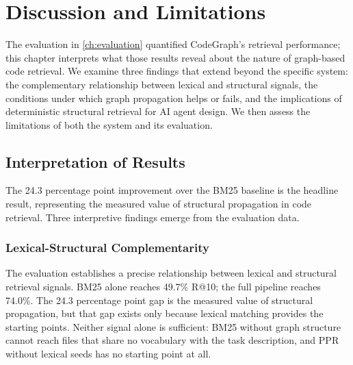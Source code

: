 
\chapter{Discussion and Limitations}
\label{ch:discussion}

The evaluation in \cref{ch:evaluation} quantified CodeGraph's retrieval performance; this chapter interprets what those results reveal about the nature of graph-based code retrieval. We examine three findings that extend beyond the specific system: the complementary relationship between lexical and structural signals, the conditions under which graph propagation helps or fails, and the implications of deterministic structural retrieval for AI agent design. We then assess the limitations of both the system and its evaluation.


\section{Interpretation of Results}
\label{sec:interpretation}

The 24.3 percentage point improvement over the BM25 baseline is the headline result, representing the measured value of structural propagation in code retrieval. Three interpretive findings emerge from the evaluation data.

\subsection{Lexical-Structural Complementarity}
\label{sec:complementarity}

The evaluation establishes a precise relationship between lexical and structural retrieval signals. BM25 alone reaches 49.7\% R@10; the full pipeline reaches 74.0\%. The 24.3 percentage point gap is the measured value of structural propagation, but that gap exists only because lexical matching provides the starting points. Neither signal alone is sufficient: BM25 without graph structure cannot reach files that share no vocabulary with the task description, and PPR without lexical seeds has no starting point at all.

